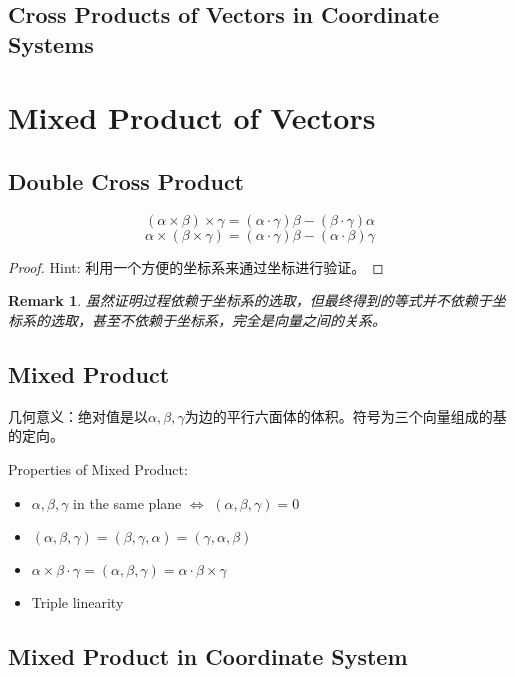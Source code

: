 \documentclass[onecolumn]{ctexart}
\newtheorem{remark}{Remark}
\begin{document}
\subsection{Cross Products of Vectors in Coordinate Systems}

\section{Mixed Product of Vectors}

\subsection{Double Cross Product}

\begin{equation}
  (\alpha \times \beta) \times \gamma = (\alpha \cdot \gamma) \beta - (\beta \cdot \gamma) \alpha
\end{equation}
\begin{equation}
  \alpha \times (\beta \times \gamma) = (\alpha \cdot \gamma) \beta - (\alpha \cdot \beta) \gamma
\end{equation}
\begin{proof}
  Hint: 利用一个方便的坐标系来通过坐标进行验证。
\end{proof}
\begin{remark}
  虽然证明过程依赖于坐标系的选取，但最终得到的等式并不依赖于坐标系的选取，甚至不依赖于坐标系，完全是向量之间的关系。
\end{remark}

\subsection{Mixed Product}

几何意义：绝对值是以$\alpha, \beta, \gamma$为边的平行六面体的体积。符号为三个向量组成的基的定向。

Properties of Mixed Product:
\begin{itemize}
  \item $\alpha, \beta, \gamma$ in the same plane $\Leftrightarrow$ $(\alpha, \beta, \gamma) = 0$
  \item $(\alpha, \beta, \gamma) = (\beta, \gamma, \alpha) = (\gamma, \alpha, \beta)$
  \item $\alpha \times \beta \cdot \gamma = (\alpha, \beta, \gamma) = \alpha \cdot \beta \times \gamma$
  \item Triple linearity
\end{itemize}

\subsection{Mixed Product in Coordinate System}
\end{document}
